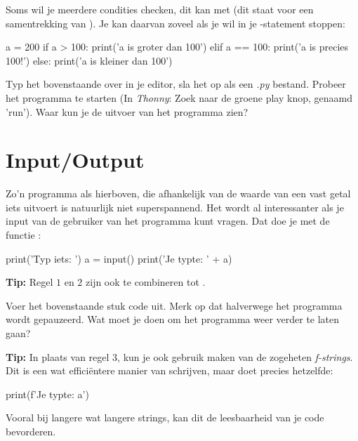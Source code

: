 Soms wil je meerdere condities checken, dit kan met  (dit staat voor een samentrekking van ). Je kan daarvan zoveel als je wil in je -statement stoppen:
\begin{python}
a = 200
if a > 100:
	print('a is groter dan 100')
elif a == 100:
	print('a is precies 100!')
else:
	print('a is kleiner dan 100')
\end{python}
\begin{exercise}
Typ het bovenstaande over in je editor, sla het op als een \textit{.py} bestand. Probeer het programma te starten (In \textit{Thonny}: Zoek naar de groene play knop, genaamd 'run'). Waar kun je de uitvoer van het programma zien?
\end{exercise}

\section{Input/Output}
Zo'n programma als hierboven, die afhankelijk van de waarde van een vast getal iets uitvoert is natuurlijk niet superspannend. Het wordt al interessanter als je input van de gebruiker van het programma kunt vragen. Dat doe je met de functie :
\begin{python}
print('Typ iets: ')
a = input()
print('Je typte: ' + a)
\end{python}

\begin{remark}
\textbf{Tip:} Regel $1$ en $2$ zijn ook te combineren tot .
\end{remark}

\begin{exercise}
Voer het bovenstaande stuk code uit. Merk op dat halverwege het programma wordt gepauzeerd. Wat moet je doen om het programma weer verder te laten gaan?
\end{exercise}

\begin{remark}
\textbf{Tip:} In plaats van regel $3$, kun je ook gebruik maken van de zogeheten \textit{f-strings}. Dit is een wat efficiëntere manier van schrijven, maar doet precies hetzelfde: 
\begin{python}
print(f'Je typte: {a}')
\end{python}
Vooral bij langere wat langere strings, kan dit de leesbaarheid van je code bevorderen.
\end{remark}

\newpage 

